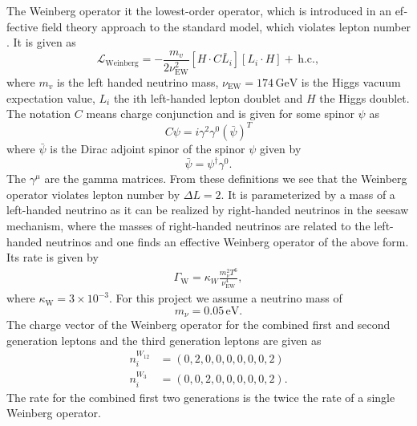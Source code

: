 \documentclass[master,       %
               twoside,        %
               BCOR10mm,       %
               english,ngerman, %
               ]{GAUBM}
\begin{document}
\begin{otherlanguage}{english}
The Weinberg operator it the lowest-order operator, which is introduced in an effective field theory approach to the standard model, which violates lepton number \cite[sec. 5]{Domcke:2020kcp_Generic_Couplings}.
It is given as
\begin{equation}
	\mathcal{L}_\mathrm{Weinberg} = - \frac{m_v}{2 \nu_\mathrm{EW}^2} [H \cdot C \bar{L}_i] [L_i \cdot H]+ \, \mathrm{h.c.},
\end{equation}
where $m_v$ is the left handed neutrino mass, $\nu_\mathrm{EW} = 174 \, \mathrm{GeV}$ is the Higgs vacuum expectation value,
$L_i$ the ith left-handed lepton doublet and $H$ the Higgs doublet.
The notation $C$ means charge conjunction and is given for some spinor $\psi$ as
\begin{equation}
	C \psi = i \gamma^2 \gamma^0 (\bar{\psi})^T
\end{equation}
where $\bar{\psi}$ is the Dirac adjoint spinor of the spinor $\psi$ given by
\begin{equation}
	\bar{\psi} = \psi^\dagger \gamma^0.
\end{equation}
The $\gamma^\mu$ are the gamma matrices.
From these definitions we see that the Weinberg operator violates lepton number by $\Delta L = 2$.
It is parameterized by a mass of a left-handed neutrino as it can be realized by right-handed neutrinos in the seesaw mechanism, where the masses of right-handed neutrinos are related to the left-handed neutrinos and one finds an effective Weinberg operator of the above form.
Its rate is given by
\begin{align}
	\Gamma_\mathrm{W} = \kappa_W\frac{m_\nu^2 T^6}{\nu_\mathrm{EW}^4},
\end{align}
where $\kappa_\mathrm{W} = 3 \times 10^{-3}$.
For this project we assume a neutrino mass of
\begin{equation}
	m_\nu = 0.05 \, \mathrm{eV}.
\end{equation}
The charge vector of the Weinberg operator for the combined first and second generation leptons and the third generation leptons are given as
\begin{align}
	n^{W_{12}}_i &= (0,2,0,0,0,0,0,0,2) \nonumber \\
	n^{W_{3}}_i &= (0,0,2,0,0,0,0,0,2).
\end{align}
The rate for the combined first two generations is the twice the rate of a single Weinberg operator.


\end{otherlanguage}
\end{document}
